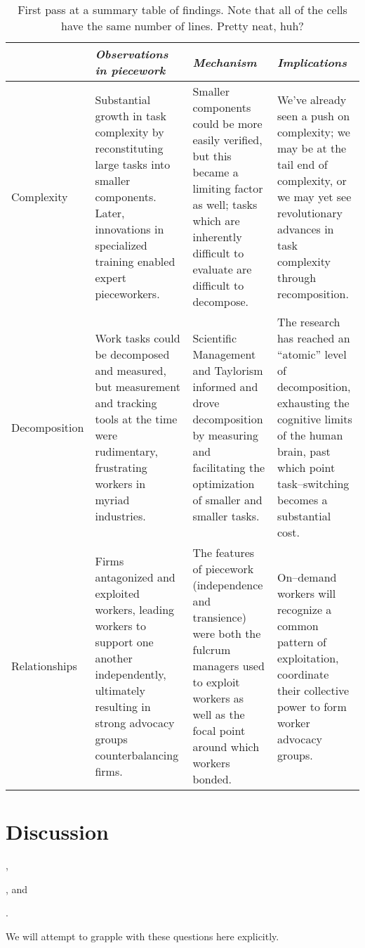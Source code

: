\documentclass[trackingWork]{subfiles}
\begin{document}
\begin{table*}[t]
  \centering
  \begin{tabularx}{\textwidth}{l X X X}
    \toprule
    & \textit{Observations in piecework} & \textit{Mechanism} & \textit{Implications} \\
    \midrule
    Complexity &
    \small{Substantial growth in task complexity by reconstituting large tasks into smaller components. Later, innovations in specialized training enabled expert pieceworkers.} &
    \small{Smaller components could be more easily verified, but this became a limiting factor as well; tasks which are inherently difficult to evaluate are difficult to decompose.} &
    \small{We've already seen a push on complexity; we may be at the tail end of complexity, or we may yet see revolutionary advances in task complexity through recomposition.} \\ \hline
    
    Decomposition &
    \small{Work tasks could be decomposed and measured, but measurement and tracking tools at the time were rudimentary, frustrating workers in myriad industries.} &
    \small{Scientific Management and Taylorism informed and drove decomposition by measuring and facilitating the optimization of smaller and smaller tasks.} &
    \small{ %
    The research has reached an ``atomic'' level of decomposition, exhausting the cognitive limits of the human brain, past which point task--switching becomes a substantial cost.} \\ \hline
    
    Relationships &
    \small{Firms antagonized and exploited workers, leading workers to support one another independently, ultimately resulting in strong advocacy groups counterbalancing firms.} &
    \small{The features of piecework (independence and transience) were both the fulcrum managers used to exploit workers as well as the focal point around which workers bonded.} &
    \small{On--demand workers will recognize a common pattern of exploitation, coordinate their collective power to form worker advocacy groups.} \\ 
    \bottomrule
  \end{tabularx}
  \caption{First pass at a summary table of findings. Note that all of the cells have the same number of lines. Pretty neat, huh?}
\end{table*}

\section{Discussion}
\begin{inlinelist}
  \item {},
  \item {}, and
  \item {}.
\end{inlinelist}
We will attempt to grapple with these questions here explicitly.
\end{document}
